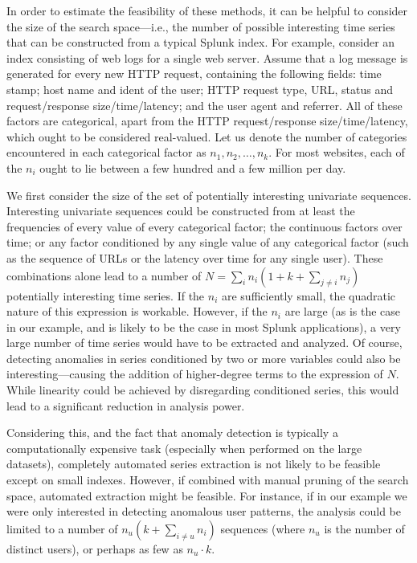 In order to estimate the feasibility of these methods, it can be helpful to consider the size of the search space---i.e.\@, the number of possible interesting time series that can be constructed from a typical Splunk index. For example, consider an index consisting of web logs for a single web server. Assume that a log message is generated for every new HTTP request, containing the following fields: time stamp; host name and ident of the user; HTTP request type, URL, status and request/response size/time/latency; and the user agent and referrer. All of these factors are categorical, apart from the HTTP request/response size/time/latency, which ought to be considered real-valued. Let us denote the number of categories encountered in each categorical factor as $n_1, n_2, \dots, n_k$. For most websites, each of the $n_i$ ought to lie between a few hundred and a few million per day.

We first consider the size of the set of potentially interesting univariate sequences. Interesting univariate sequences could be constructed from at least the frequencies of every value of every categorical factor; the continuous factors over time; or any factor conditioned by any single value of any categorical factor (such as the sequence of URLs or the latency over time for any single user). These combinations alone lead to a number of $N = \sum_i n_i (1 + k + \sum_{j \neq i} n_j)$ potentially interesting time series. If the $n_i$ are sufficiently small, the quadratic nature of this expression is workable. However, if the $n_i$ are large (as is the case in our example, and is likely to be the case in most Splunk applications), a very large number of time series would have to be extracted and analyzed. Of course, detecting anomalies in series conditioned by two or more variables could also be interesting---causing the addition of higher-degree terms to the expression of $N$. While linearity could be achieved by disregarding conditioned series, this would lead to a significant reduction in analysis power.

Considering this, and the fact that anomaly detection is typically a computationally expensive task (especially when performed on the large datasets), completely automated series extraction is not likely to be feasible except on small indexes. However, if combined with manual pruning of the search space, automated extraction might be feasible. For instance, if in our example we were only interested in detecting anomalous user patterns, the analysis could be limited to a number of $n_u (k + \sum_{i \neq u} n_i)$ sequences (where $n_u$ is the number of distinct users), or perhaps as few as $n_u \cdot k$.

